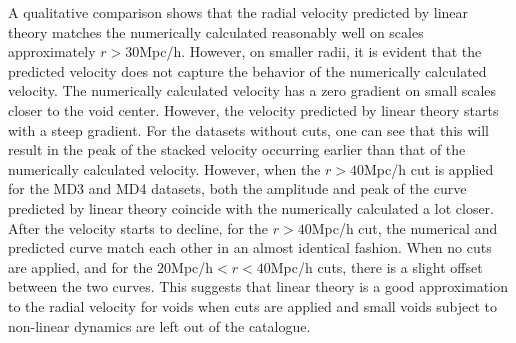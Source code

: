 A qualitative comparison shows that the radial velocity predicted by linear theory matches the numerically calculated reasonably well on scales approximately $r>30$Mpc/h. However, on smaller radii, it is evident that the predicted velocity does not capture the behavior of the numerically calculated velocity. The numerically calculated velocity has a zero gradient on small scales closer to the void center. However, the velocity predicted by linear theory starts with a steep gradient. For the datasets without cuts, one can see that this will result in the peak of the stacked velocity occurring earlier than that of the numerically calculated velocity. However, when the $r>40$Mpc/h cut is applied for the MD3 and MD4 datasets, both the amplitude and peak of the curve predicted by linear theory coincide with the numerically calculated a lot closer. After the velocity starts to decline, for the $r>40$Mpc/h cut, the numerical and predicted curve match each other in an almost identical fashion. When no cuts are applied, and for the $20$Mpc/h$<r<40$Mpc/h cuts, there is a slight offset between the two curves. This suggests that linear theory is a good approximation to the radial velocity for voids when cuts are applied and small voids subject to non-linear dynamics are left out of the catalogue.\\\indent
